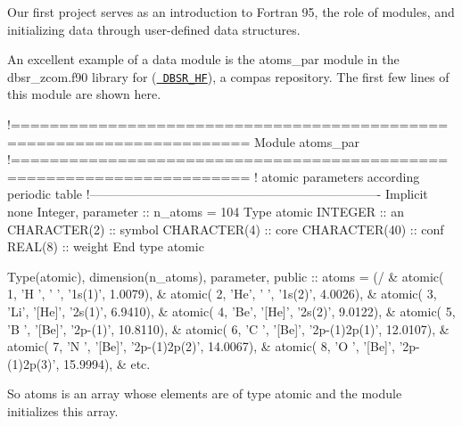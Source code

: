 Our first project serves as an introduction to Fortran 95, the role of modules, and initializing data through user-\/defined data structures.

An excellent example of a data module is the {\ttfamily atoms\+\_\+par} module in the {\ttfamily dbsr\+\_\+zcom.\+f90} library for (\href{https://github.com/compas/DBSR_HF}{\texttt{ D\+B\+S\+R\+\_\+\+HF}}), a compas repository. The first few lines of this module are shown here. \begin{DoxyVerb}!======================================================================  
      Module atoms_par    
!======================================================================  
!     atomic parameters according periodic table  
!----------------------------------------------------------------------  
      Implicit none  
      Integer, parameter :: n_atoms = 104    
      Type atomic  
        INTEGER :: an  
        CHARACTER(2) :: symbol  
        CHARACTER(4) :: core
        CHARACTER(40) :: conf
        REAL(8) :: weight
      End type atomic

  Type(atomic), dimension(n_atoms), parameter, public :: atoms = (/  &
   atomic(   1,  'H ',  '    ',  '1s(1)',                   1.0079), &
   atomic(   2,  'He',  '    ',  '1s(2)',                   4.0026), &
   atomic(   3,  'Li',  '[He]',  '2s(1)',                   6.9410), &
   atomic(   4,  'Be',  '[He]',  '2s(2)',                   9.0122), &
   atomic(   5,  'B ',  '[Be]',  '2p-(1)',                 10.8110), &
   atomic(   6,  'C ',  '[Be]',  '2p-(1)2p(1)',            12.0107), &
   atomic(   7,  'N ',  '[Be]',  '2p-(1)2p(2)',            14.0067), &
   atomic(   8,  'O ',  '[Be]',  '2p-(1)2p(3)',            15.9994), &
   etc.
\end{DoxyVerb}
 So {\ttfamily atoms} is an array whose elements are of type {\ttfamily atomic} and the module initializes this array.

